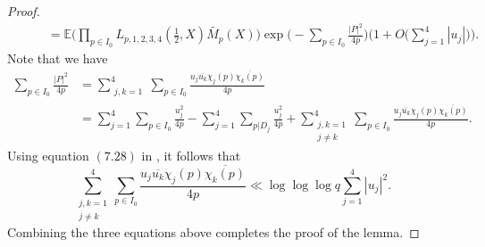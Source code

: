\documentclass[12pt, reqno]{amsart}
\newcommand{\E}{\mathbb{E}}
\numberwithin{equation}{section}
\numberwithin{theorem}{section}
\numberwithin{equation}{section}
\begin{document}
\begin{proof}
\begin{align*}
    &\qquad =   \E \Bigg( \prod_{p \in I_0} L_{p,1,2,3,4}( \tfrac{1}{2},X) \widetilde{M_p}(X) \Bigg) \exp \Big( - \sum_{p \in I_0} \frac{|P|^2}{4p} \Big) \bigg( 1 + O \Big( \sum_{j=1}^4 |u_j| \Big)\bigg). 
    \end{align*}
     Note that we have
   \begin{align*}
       \sum_{p \in I_0 } \frac{|P|^2}{4p} & = \sum_{\substack{j,k=1}}^4 \sum_{p \in I_0} \frac{ u_j \overline{u_k} \chi_j(p) \overline{\chi_k(p)}}{4p} \\
       &= \sum_{j=1}^4 \sum_{p \in I_0} \frac{u_j^2}{4p} - \sum_{j=1}^4 \sum_{p |D_j} \frac{u_j^2}{4p}+ \sum_{\substack{j,k=1\\j \neq k}}^4 \sum_{p \in I_0} \frac{ u_j \overline{u_k} \chi_j(p) \overline{\chi_k(p)}}{4p}.
   \end{align*}
 Using equation $(7.28)$ in \cite{BFM}, it follows that  
   $$ \sum_{\substack{j,k=1\\j \neq k}}^4  \sum_{p \in I_0} \frac{ u_j \overline{u_k} \chi_j(p) \overline{\chi_k(p)}}{4p} \ll \log\log\log q \sum_{j=1}^4 |u_j|^2 .$$
   Combining the three equations above completes the proof of the lemma.
     \end{proof}
\end{document}
